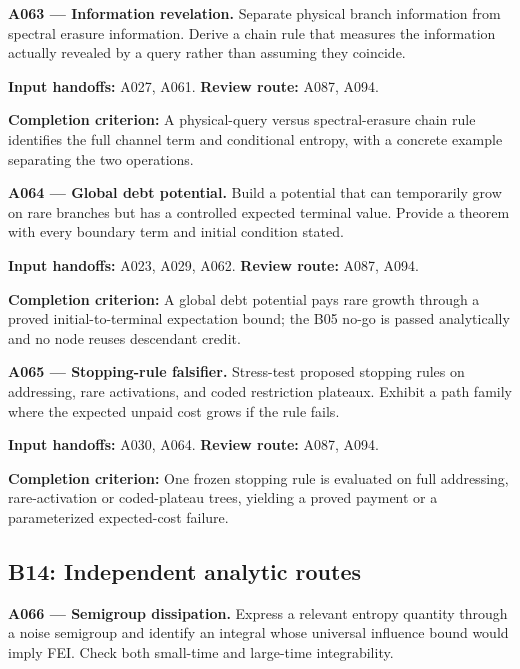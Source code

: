 \documentclass[11pt]{article}
\begin{document}
\textbf{A063 --- Information revelation.} Separate physical branch information from spectral erasure information. Derive a chain rule that measures the information actually revealed by a query rather than assuming they coincide.

{\small\color{ink}\textbf{Input handoffs:} A027, A061. \textbf{Review route:} A087, A094.\par
\textbf{Completion criterion:} A physical-query versus spectral-erasure chain rule identifies the full channel term and conditional entropy, with a concrete example separating the two operations.\par}



\textbf{A064 --- Global debt potential.} Build a potential that can temporarily grow on rare branches but has a controlled expected terminal value. Provide a theorem with every boundary term and initial condition stated.

{\small\color{ink}\textbf{Input handoffs:} A023, A029, A062. \textbf{Review route:} A087, A094.\par
\textbf{Completion criterion:} A global debt potential pays rare growth through a proved initial-to-terminal expectation bound; the B05 no-go is passed analytically and no node reuses descendant credit.\par}



\textbf{A065 --- Stopping-rule falsifier.} Stress-test proposed stopping rules on addressing, rare activations, and coded restriction plateaux. Exhibit a path family where the expected unpaid cost grows if the rule fails.

{\small\color{ink}\textbf{Input handoffs:} A030, A064. \textbf{Review route:} A087, A094.\par
\textbf{Completion criterion:} One frozen stopping rule is evaluated on full addressing, rare-activation or coded-plateau trees, yielding a proved payment or a parameterized expected-cost failure.\par}



\subsection{B14: Independent analytic routes}

\textbf{A066 --- Semigroup dissipation.} Express a relevant entropy quantity through a noise semigroup and identify an integral whose universal influence bound would imply FEI. Check both small-time and large-time integrability.
\end{document}
